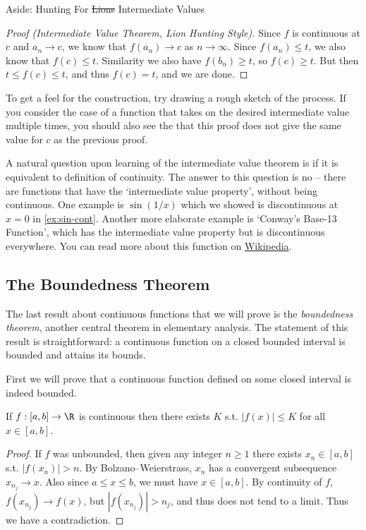\begin{aside}{Aside: Hunting For \st{Lions} Intermediate Values}
\begin{proof}[Proof (Intermediate Value Theorem, Lion Hunting Style)]
Since $f$ is continuous at $c$ and $a_n \rightarrow c$, we know that $f(a_n) \rightarrow c$ as $n \rightarrow \infty$. Since $f(a_n) \leq t$, we also know that $f(c) \leq t$. Similarity we also have $f(b_n) \geq t$, so $f(c) \geq t$. But then $t \leq f(c) \leq t$, and thus $f(c) = t$, and we are done.
	\end{proof}

	To get a feel for the construction, try drawing a rough sketch of the process. If you consider the case of a function that takes on the desired intermediate value multiple times, you should also see the that this proof does not give the same value for $c$ as the previous proof.

\end{aside}


A natural question upon learning of the intermediate value theorem is if it is equivalent to definition of continuity. The answer to this question is no -- there are functions that have the `intermediate value property', without being continuous. One example is $\sin(1/x)$ which we showed is discontinuous at $x = 0$ in \autoref{ex:sin-cont}. Another more elaborate example is `Conway's Base-13 Function', which has the intermediate value property but is discontinuous everywhere. You can read more about this function on \href{https://en.wikipedia.org/wiki/Conway_base_13_function}{Wikipedia}.


\subsection{The Boundedness Theorem}

The last result about continuous functions that we will prove is the \emph{boundedness theorem}, another central theorem in elementary analysis. The statement of this result is straightforward: a continuous function on a closed bounded interval is bounded and attains its bounds.

First we will prove that a continuous function defined on some closed interval is indeed bounded.
\begin{lemma}
	If $f:[a, b] \rightarrow \R$ is continuous then there exists $K$ s.t. $|f(x)| \leq K$ for all $x \in [a, b]$.
\end{lemma}
\begin{proof}
If $f$ was unbounded, then given any integer $n \geq 1$ there exists $x_n \in [a, b]$ s.t. $|f(x_n)| > n$. By Bolzano–Weierstrass, $x_n$ has a convergent subsequence $x_{n_j} \rightarrow x$. Also since $a \leq x \leq b$, we must have $x \in [a, b]$.
By continuity of $f$, $f(x_{n_j}) \rightarrow f(x)$, but $|f(x_{n_j})| > n_j$, and thus does not tend to a limit. Thus we have a contradiction.
\end{proof}

